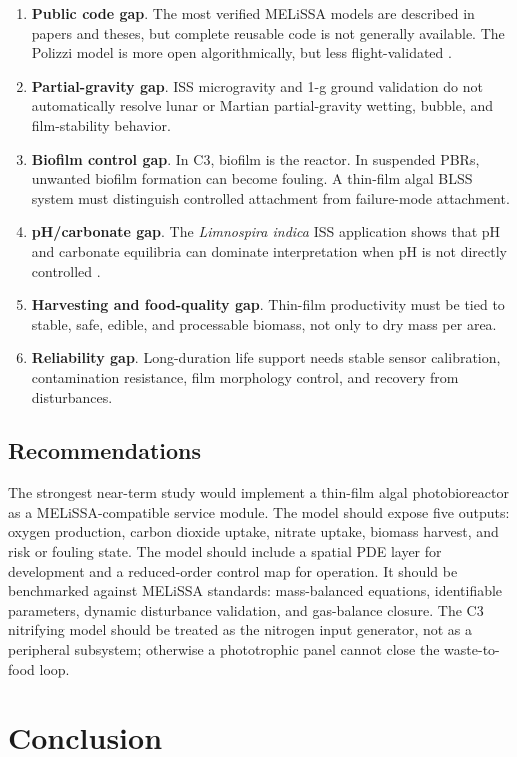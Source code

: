 \documentclass[11pt]{article}
\newcommand{\MEL}{MELiSSA}
\newcommand{\Limno}{\textit{Limnospira indica}}
\begin{document}
\begin{enumerate}
  \item \textbf{Public code gap}. The most verified \MEL{} models are described in papers and theses, but complete reusable code is not generally available. The Polizzi model is more open algorithmically, but less flight-validated \parencite[5]{polizzi2022}.
  \item \textbf{Partial-gravity gap}. ISS microgravity and 1-g ground validation do not automatically resolve lunar or Martian partial-gravity wetting, bubble, and film-stability behavior.
  \item \textbf{Biofilm control gap}. In C3, biofilm is the reactor. In suspended PBRs, unwanted biofilm formation can become fouling. A thin-film algal BLSS system must distinguish controlled attachment from failure-mode attachment.
  \item \textbf{pH/carbonate gap}. The \Limno{} ISS application shows that pH and carbonate equilibria can dominate interpretation when pH is not directly controlled \parencite[8--9]{poughon2021}.
  \item \textbf{Harvesting and food-quality gap}. Thin-film productivity must be tied to stable, safe, edible, and processable biomass, not only to dry mass per area.
  \item \textbf{Reliability gap}. Long-duration life support needs stable sensor calibration, contamination resistance, film morphology control, and recovery from disturbances.
\end{enumerate}

\subsection{Recommendations}

The strongest near-term study would implement a thin-film algal photobioreactor as a \MEL{}-compatible service module. The model should expose five outputs: oxygen production, carbon dioxide uptake, nitrate uptake, biomass harvest, and risk or fouling state. The model should include a spatial PDE layer for development and a reduced-order control map for operation. It should be benchmarked against \MEL{} standards: mass-balanced equations, identifiable parameters, dynamic disturbance validation, and gas-balance closure. The C3 nitrifying model should be treated as the nitrogen input generator, not as a peripheral subsystem; otherwise a phototrophic panel cannot close the waste-to-food loop.

\section{Conclusion}
\end{document}
